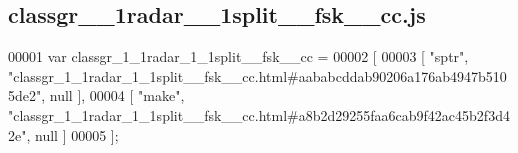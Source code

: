 \subsection{classgr\+\_\+\_\+1radar\+\_\+\_\+1split\+\_\+\+\_\+fsk\+\_\+\+\_\+cc.\+js}
\label{classgr__1__1radar__1__1split____fsk____cc_8js_source}

\begin{DoxyCode}
00001 var classgr_1_1radar_1_1split__fsk__cc =
00002 [
00003     [ \textcolor{stringliteral}{"sptr"}, \textcolor{stringliteral}{"classgr\_1\_1radar\_1\_1split\_\_fsk\_\_cc.html#aababcddab90206a176ab4947b5105de2"}, null ],
00004     [ \textcolor{stringliteral}{"make"}, \textcolor{stringliteral}{"classgr\_1\_1radar\_1\_1split\_\_fsk\_\_cc.html#a8b2d29255faa6cab9f42ac45b2f3d42e"}, null ]
00005 ];
\end{DoxyCode}
